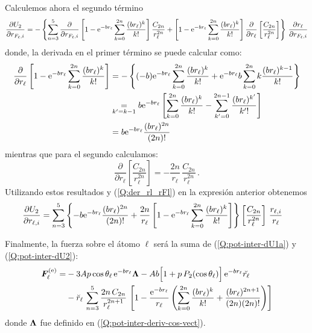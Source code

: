 \begin{subappendices}
Calculemos ahora el segundo t\'{e}rmino
\begin{equation*}
  \frac{\partial U_{2}}{\partial r_{F_{\ell},i}} = - \left\{\sum_{n=3}^{5} \frac{\partial}{\partial r_{F_{\ell},i}}\left[ 1 - \mathrm{e}^{-br_{\ell}} \sum_{k=0}^{2n}\frac{(br_{\ell})^{k}}{k!}\right] \frac{C_{2n}}{r_{\ell}^{2n}} + \left[ 1 - \mathrm{e}^{-br_{\ell}} \sum_{k=0}^{2n}\frac{(br_{\ell})^{k}}{k!}\right] \frac{\partial}{\partial r_{\ell}}\left[ \frac{C_{2n}}{r_{\ell}^{2n}}\right] \right\} \, \frac{\partial r_{\ell}}{\partial r_{F_{\ell},i}}
\end{equation*}
%
donde, la derivada en el primer t\'{e}rmino se puede calcular como:
\begin{align*}
 \frac{\partial}{\partial r_{\ell}}\left[ 1 - \mathrm{e}^{-br_{\ell}} \sum_{k=0}^{2n}\frac{(br_{\ell})^{k}}{k!}\right] &= - \left\{(-b) \mathrm{e}^{-br_{\ell}} \sum_{k=0}^{2n}\frac{(br_{\ell})^{k}}{k!} + \mathrm{e}^{-br_{\ell}} b \, { \sum_{k=0}^{2n}  k \frac{(br_{\ell})^{k-1}}{k!}} \right\} 
\\
&\mathrel{\mathop{\kern0pt=}\limits_{k'=k-1}}  b \mathrm{e}^{-br_{\ell}} \left[\sum_{k=0}^{2n}\frac{(br_{\ell})^{k}}{k!} - \sum_{k'=0}^{2n-1} \frac{(br_{\ell})^{k'}}{k'!}\right] 
\\
&=  b \mathrm{e}^{-br_{\ell}} \frac{(b r_{\ell})^{2n}}{(2n)!}
\end{align*}
%
mientras que para el segundo calculamos:
\begin{equation*}
 \frac{\partial}{\partial r_{\ell}}\left[ \frac{C_{2n}}{r_{\ell}^{2n}}\right] = -\frac{2n}{r_{\ell}}\, \frac{C_{2n}}{r_{\ell}^{2n}} \,.
\end{equation*}
%
Utilizando estos resultados y (\ref{Q:der_rl_rFl}) en la expresi\'{o}n anterior obtenemos
\begin{align}\label{Q:pot-inter-dU2}
  \frac{\partial U_{2}}{\partial r_{\ell,i}} &= \sum_{n=3}^{5} \left\{ -b \mathrm{e}^{-br_{\ell}} \frac{(b r_{\ell})^{2n}}{(2n)!} + \frac{2n}{r_{\ell}} \left[ 1 - \mathrm{e}^{-br_{\ell}} \sum_{k=0}^{2n}\frac{(br_{\ell})^{k}}{k!}\right] \right\}  \left[ \frac{C_{2n}}{r_{\ell}^{2n}}\right]\, \frac{r_{\ell,i}}{r_{\ell}} 
\end{align}
\medskip

Finalmente, la fuerza sobre el \'{a}tomo $\ell$ ser\'{a} la suma de (\ref{Q:pot-inter-dU1a}) y (\ref{Q:pot-inter-dU2}): 
%
\begin{align} \label{Q:pot-inter-fuerzas}
    \bm{F}^{\text{(e)}}_{\ell} =& - 3 A p \cos \theta_{\ell}\, \mathrm{e}^{-b r_{\ell}} \bm{\Lambda} - A b \Big[1 + p\, P_{2}(\cos \theta_{\ell})\Big]\,\mathrm{e}^{-b r_{\ell}} \breve{r_{\ell}} \nonumber \\
                     &- \breve{r}_{\ell}\, \sum_{n=3}^{5} \frac{2 n\, C_{2n}}{r_{\ell}^{2n+1}} \,\left[ 1 - \frac{\mathrm{e}^{-br_{\ell}}}{r_{\ell}} \left( \sum_{k=0}^{2n}\frac{(br_{\ell})^{k}}{k!} + \frac{(br_{\ell})^{2n+1}}{(2n)(2n)!} \right) \right] 
\end{align}
%
donde $\bm{\Lambda}$ fue definido en (\ref{Q:pot-inter-deriv-cos-vect}).


\end{subappendices}
